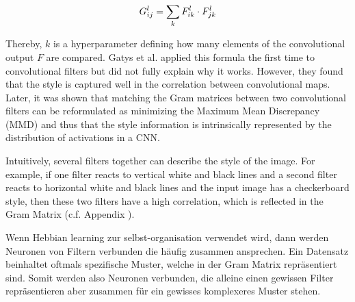 \begin{equation}\eqlbl{Gram_mat}
		G_{ij}^{l} = \sum_k F^{l}_{ik} \cdot F^{l}_{jk}
\end{equation}%

Thereby, $k$ is a hyperparameter defining how many elements of the convolutional output $F$ are compared.
Gatys et al.  applied this formula the first time to convolutional filters but did not fully explain why it works.
However, they found that the style is captured well in the correlation between convolutional maps.
Later, it was shown  that matching the Gram matrices between two convolutional filters can be reformulated as minimizing the Maximum Mean Discrepancy (MMD)  and thus that the style information is intrinsically represented by the distribution of activations in a CNN.

Intuitively, several filters together can describe the style of the image.
For example, if one filter reacts to vertical white and black lines and a second filter reacts to horizontal white and black lines and the input image has a checkerboard style, then these two filters have a high correlation, which is reflected in the Gram Matrix (c.f. Appendix ).

Wenn Hebbian learning zur selbst-organisation verwendet wird, dann werden Neuronen von Filtern verbunden die häufig zusammen ansprechen.
Ein Datensatz beinhaltet oftmals spezifische Muster, welche in der Gram Matrix repräsentiert sind.
Somit werden also Neuronen verbunden, die alleine einen gewissen Filter repräsentieren aber zusammen für ein gewisses komplexeres Muster stehen.



